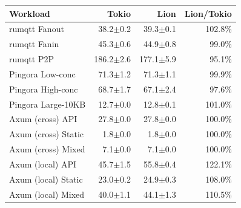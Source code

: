 \begin{tabular}{@{}l r r r@{}}
\toprule
Workload & Tokio & Lion & Lion/Tokio \\
\midrule
rumqtt Fanout & 38.2$\pm$0.2 & 39.3$\pm$0.1 & 102.8\% \\
rumqtt Fanin & 45.3$\pm$0.6 & 44.9$\pm$0.8 & 99.0\% \\
rumqtt P2P & 186.2$\pm$2.6 & 177.1$\pm$5.9 & 95.1\% \\
Pingora Low-conc & 71.3$\pm$1.2 & 71.3$\pm$1.1 & 99.9\% \\
Pingora High-conc & 68.7$\pm$1.7 & 67.1$\pm$2.4 & 97.6\% \\
Pingora Large-10KB & 12.7$\pm$0.0 & 12.8$\pm$0.1 & 101.0\% \\
Axum (cross) API & 27.8$\pm$0.0 & 27.8$\pm$0.0 & 100.0\% \\
Axum (cross) Static & 1.8$\pm$0.0 & 1.8$\pm$0.0 & 100.0\% \\
Axum (cross) Mixed & 7.1$\pm$0.0 & 7.1$\pm$0.0 & 100.0\% \\
Axum (local) API & 45.7$\pm$1.5 & 55.8$\pm$0.4 & 122.1\% \\
Axum (local) Static & 23.0$\pm$0.2 & 24.9$\pm$0.3 & 108.0\% \\
Axum (local) Mixed & 40.0$\pm$1.1 & 44.1$\pm$1.3 & 110.5\% \\
\bottomrule
\end{tabular}
